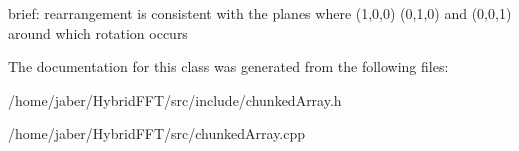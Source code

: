 brief\+: rearrangement is consistent with the planes where (1,0,0) (0,1,0) and (0,0,1) around which rotation occurs 

The documentation for this class was generated from the following files\+:\begin{DoxyCompactItemize}
\item 
/home/jaber/\+Hybrid\+F\+F\+T/src/include/chunked\+Array.\+h\item 
/home/jaber/\+Hybrid\+F\+F\+T/src/chunked\+Array.\+cpp\end{DoxyCompactItemize}
